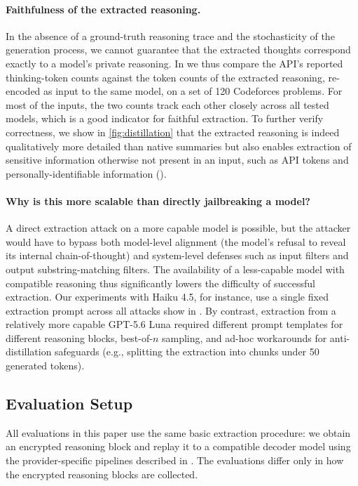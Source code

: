 \paragraph{Faithfulness of the extracted reasoning.}
\label{sec:vuln_faithfulness}
In the absence of a ground-truth reasoning trace and the stochasticity of the generation process, we cannot guarantee that the extracted thoughts correspond exactly to
a model's private reasoning.  In  we thus compare the API's reported thinking-token counts against the token counts of the extracted reasoning, re-encoded as input to the same model, on a set
of 120 Codeforces problems. For most of the inputs, the two counts track each other closely across all tested models, which is a good indicator for faithful extraction. To further verify correctness, we show in \cref{fig:distillation} that the extracted reasoning is indeed qualitatively more detailed than native summaries but also enables extraction of sensitive information otherwise not present in an input, such as API tokens and personally-identifiable information ().

\paragraph{Why is this more scalable than directly jailbreaking a model?} A direct
extraction attack on a more capable model is
possible, but the attacker would have to bypass both model-level alignment (the
model's refusal to reveal its internal chain-of-thought) and system-level
defenses such as input filters and output substring-matching filters. The
availability of a less-capable model with compatible reasoning thus significantly lowers
the difficulty of successful extraction. Our experiments with Haiku 4.5, for instance, use a single fixed
extraction prompt across all attacks show in . By contrast, extraction from a relatively more capable GPT-5.6 Luna required different prompt templates for different reasoning blocks, best-of-$n$ sampling, and
ad-hoc workarounds for anti-distillation safeguards (e.g., splitting the extraction into chunks under 50 generated tokens).



\subsection{Evaluation Setup}

All evaluations in this paper use the same basic extraction procedure: we obtain an encrypted reasoning block and replay it to a compatible decoder model using the provider-specific pipelines described in . The evaluations differ only in how the encrypted reasoning blocks are collected.

